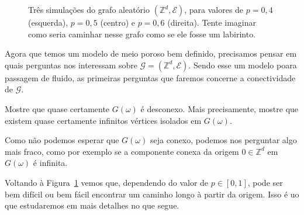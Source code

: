 \begin{topics}
\begin{figure}[!ht]
  \centering
  \caption{Três simulações do grafo aleatório $(\mathbb{Z}^d, \mathcal{E})$, para valores de $p = 0,4$ (esquerda), $p = 0,5$ (centro) e $p = 0,6$ (direita). Tente imaginar como seria caminhar nesse grafo como se ele fosse um labirinto.}
  \label{f:percola}
\end{figure}

Agora que temos um modelo de meio poroso bem definido, precisamos pensar em quais perguntas nos interessam sobre $\mathcal{G} = (\mathbb{Z}^d, \mathcal{E})$.
Sendo esse um modelo poara passagem de fluido, as primeiras perguntas que faremos concerne a conectividade de $\mathcal{G}$.

\begin{exercise}
  Mostre que quase certamente $G(\omega)$ é desconexo.
  Mais precisamente, mostre que existem quase certamente infinitos vértices isolados em $G(\omega)$.
\end{exercise}

Como não podemos esperar que $G(\omega)$ seja conexo, podemos nos perguntar algo mais fraco, como por exemplo se a
componente conexa da origem $0 \in \mathbb{Z}^d$ em $G(\omega)$ é infinita.

Voltando à Figura~\ref{f:percola} vemos que, dependendo do valor de $p \in [0,1]$, pode ser bem difícil ou bem fácil encontrar um caminho longo à partir da origem.
Isso é uo que estudaremos em mais detalhes no que segue.


\end{topics}
